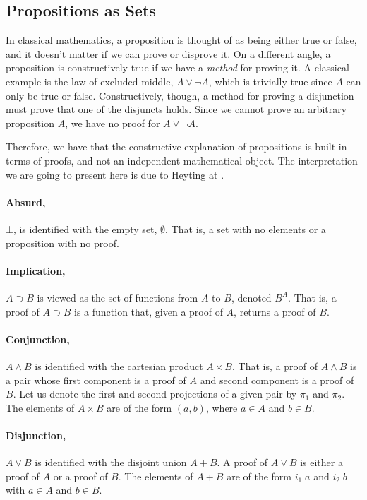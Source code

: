 \subsection{Propositions as Sets}
\label{subsec:martinlof:propositionsassets}

In classical mathematics, a proposition is thought of as being either true or false, and it doesn't
matter if we can prove or disprove it. On a different angle, a proposition is constructively true
if we have a \emph{method} for proving it. A classical example is the law of excluded middle, $A \vee \neg A$,
which is trivially true since $A$ can only be true or false. Constructively, though, a method for proving a disjunction
must prove that one of the disjuncts holds. Since we cannot prove an arbitrary proposition $A$, we have
no proof for $A \vee \neg A$. 

Therefore, we have that the constructive explanation of propositions is built in terms of proofs, and
not an independent mathematical object. The interpretation we are going to present here is due
to Heyting at \cite{Heyting71}.

\paragraph{Absurd,} $\bot$, is identified with the empty set, $\emptyset$. That is, a set with no elements
or a proposition with no proof.

\paragraph{Implication,} $A \supset B$ is viewed as the set of functions from $A$ to $B$, denoted $B^A$. That is,
a proof of $A \supset B$ is a function that, given a proof of $A$, returns a proof of $B$.

\newcommand{\pone}{\pi_1}
\newcommand{\ptwo}{\pi_2}
\paragraph{Conjunction,} $A \wedge B$ is identified with the cartesian product $A \times B$. That is, a proof
of $A \wedge B$ is a pair whose first component is a proof of $A$ and second component is a proof of $B$.
Let us denote the first and second projections of a given pair by $\pone$ and $\ptwo$.
The elements of $A \times B$ are of the form $(a, b)$, where $a \in A$ and $b \in B$.

\newcommand{\ione}{i_1}
\newcommand{\itwo}{i_2}
\paragraph{Disjunction,} $A \vee B$ is identified with the disjoint union $A + B$. A proof
of $A \vee B$ is either a proof of $A$ or a proof of $B$. The elements of $A + B$ are of the
form $\ione\; a$ and $\itwo\; b$ with $a \in A$ and $b \in B$.

